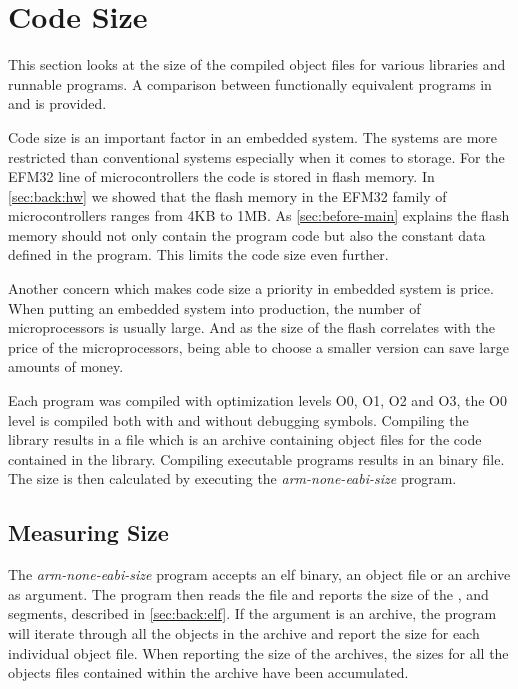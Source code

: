 \section{Code Size}
\label{sec:res:code-size}

This section looks at the size of the compiled object files for various {\rust} libraries and runnable programs.
A comparison between functionally equivalent programs in {\C} and {\rust} is provided.

Code size is an important factor in an embedded system.
The systems are more restricted than conventional systems especially when it comes to storage.
For the EFM32 line of microcontrollers the code is stored in flash memory.
In \autoref{sec:back:hw} we showed that the flash memory in the EFM32 family of microcontrollers ranges from 4KB to 1MB.
As \autoref{sec:before-main} explains the flash memory should not only contain the program code but also the constant data defined in the program.
This limits the code size even further.

Another concern which makes code size a priority in embedded system is price.
When putting an embedded system into production, the number of microprocessors is usually large.
And as the size of the flash correlates with the price of the microprocessors, being able to choose a smaller version can save large amounts of money.

Each program was compiled with optimization levels O0, O1, O2 and O3, the O0 level is compiled both with and without debugging symbols.
Compiling the library results in a  file which is an archive containing object files for the code contained in the library.
Compiling executable programs results in an {\elf} binary file.
The size is then calculated by executing the \emph{arm-none-eabi-size} program.

\subsection{Measuring Size}
\label{sec:measure-size}

The \emph{arm-none-eabi-size} program accepts an elf binary, an object file or an archive as argument.
The program then reads the file and reports the size of the ,  and  segments, described in \autoref{sec:back:elf}.
If the argument is an archive, the program will iterate through all the objects in the archive and report the size for each individual object file.
When reporting the size of the archives, the sizes for all the objects files contained within the archive have been accumulated.

